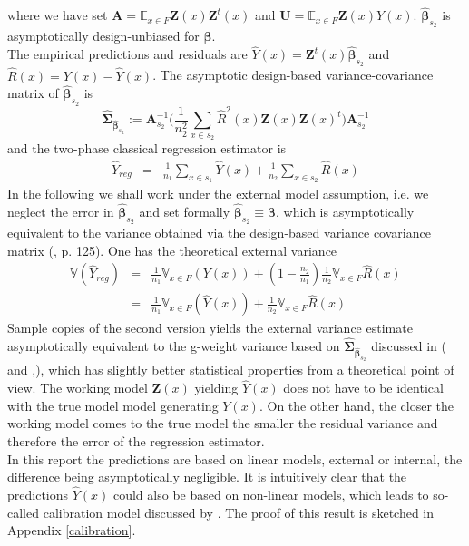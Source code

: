 \documentclass[a4paper,12pt,leqno, titlepage]{article}
\newcommand{\EX}{\mathbb{E}}
\newcommand{\VAR}{\mathbb{V}}
\begin{document}
 where we have set $\pmb{A}=\EX_{x\in{F}}\pmb{Z}(x)\pmb{Z}^t(x)$ and $\pmb{U}=\EX_{x\in{F}}\pmb{Z}(x)Y(x)$.
$\hat{\pmb{\beta}}_{s_2}$ is asymptotically design-unbiased for $\pmb{\beta}$. \\
 The empirical predictions and residuals are $\hat{Y}(x)=\pmb{Z}^t(x)\hat{\pmb{\beta}}_{s_2}$ and $\hat{R}(x)=Y(x)-\hat{Y}(x)$. The asymptotic design-based variance-covariance matrix of $\hat{\pmb{\beta}}_{s_2}$ is
 \begin{equation}\label{estvarmatrix}
\hat{\pmb{\Sigma}}_{\hat{\pmb{\beta}}_{s_2}}:=\pmb{A}_{s_2}^{-1}
\Big(\frac{1}{n_2^2}\sum_{x\in{s_2}}\hat{R}^2(x)\pmb{Z}(x)\pmb{Z}(x)^t\Big)\pmb{A}_{s_2}^{-1}
\end{equation}
and the two-phase classical regression estimator is
  \begin{eqnarray}\label{regressionestimators}
\hat{Y}_{reg}&=&\frac{1}{n_{1}}\sum_{x\in{s_{1}}}\hat{Y}(x)+\frac{1}{n_{2}}
\sum_{x\in{s_{2}}}\hat{R}(x)\nonumber
\end{eqnarray}
\noindent
In the following we shall work under the external model assumption, i.e. we neglect the error in $\hat{\pmb{\beta}}_{s_2}$ and set formally $\hat{\pmb{\beta}}_{s_2}\equiv \pmb{\beta}$, which is asymptotically equivalent to the variance obtained via the design-based variance covariance matrix (\cite{mandallaz}, p. 125). One has the theoretical external variance
\begin{eqnarray}\label{varreg2}
\VAR(\hat{Y}_{reg})& =&
\frac{1}{n_{1}}\VAR_{x\in{F}}(Y(x))+(1-\frac{n_{2}}{n_{1}})\frac{1}{n_{2}}\VAR_{x\in{F}}\hat{R}(x)\nonumber \\
& =&
\frac{1}{n_{1}}\VAR_{x\in{F}}(\hat{Y}(x))+\frac{1}{n_{2}}\VAR_{x\in{F}}\hat{R}(x)
\end{eqnarray}
Sample copies of the second version yields the external variance estimate asymptotically equivalent to the g-weight variance based on $\hat{\pmb{\Sigma}}_{\hat{\pmb{\beta}}_{s_2}}$ discussed in
(\cite{mandallaz} and \cite{mandallaz3},), which has slightly better statistical properties from a theoretical point of view. The working model $\pmb{Z}(x)$ yielding $\hat{Y}(x)$ does not have to be identical with the true model model generating $Y(x)$. On the other hand, the closer the working model comes to the true model the smaller the residual variance and therefore the error of the regression estimator.\\
 In this report the predictions are based on linear models, external or internal, the difference being asymptotically negligible. It is intuitively clear that the predictions $\hat{Y}(x)$ could also be based on non-linear models, which leads to so-called calibration model discussed by \cite{wusitter1}. The proof of this result is sketched in Appendix \ref{calibration}.
\end{document}
